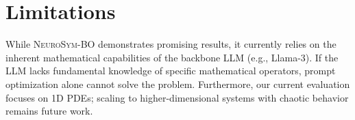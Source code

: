 \section*{Limitations}
While \textsc{NeuroSym-BO} demonstrates promising results, it currently relies on the inherent mathematical capabilities of the backbone LLM (e.g., Llama-3). If the LLM lacks fundamental knowledge of specific mathematical operators, prompt optimization alone cannot solve the problem. Furthermore, our current evaluation focuses on 1D PDEs; scaling to higher-dimensional systems with chaotic behavior remains future work.

